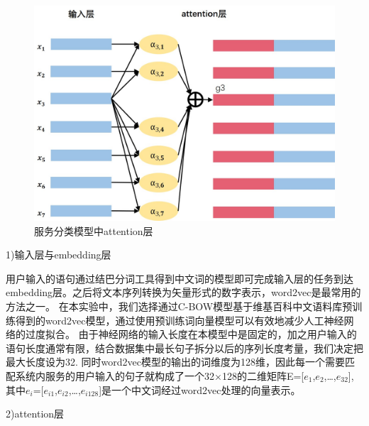   \begin{figure}[htbp]
    \centering
    \includegraphics[scale=0.4]{./images/attcnn.jpg}
    \caption{服务分类模型中attention层}
    \label{fig:att-cnn}
  \end{figure}


  1)输入层与embedding层

  用户输入的语句通过结巴分词工具得到中文词的模型即可完成输入层的任务到达embedding层。之后将文本序列转换为矢量形式的数字表示，word2vec是最常用的方法之一。
  在本实验中，我们选择通过C-BOW模型基于维基百科中文语料库预训练得到的word2vec模型，通过使用预训练词向量模型可以有效地减少人工神经网络的过度拟合。
  由于神经网络的输入长度在本模型中是固定的，加之用户输入的语句长度通常有限，结合数据集中最长句子拆分以后的序列长度考量，我们决定把最大长度设为32.
  同时word2vec模型的输出的词维度为128维，因此每一个需要匹配系统内服务的用户输入的句子就构成了一个32×128的二维矩阵E=[$e_{1}$,$e_{2}$,\dots,$e_{32}$],
  其中$e_{i}$=[$e_{i1}$,$e_{i2}$,\dots,$e_{i128}$]是一个中文词经过word2vec处理的向量表示。

  2)attention层

